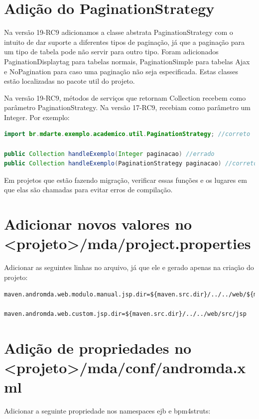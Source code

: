 \section{Adição do PaginationStrategy}
Na versão 19-RC9 adicionamos a classe abstrata PaginationStrategy com o intuito
de dar suporte a diferentes tipos de paginação, já que a paginação para um tipo de tabela pode não servir para outro tipo. Foram adicionados PaginationDisplaytag para tabelas normais, PaginationSimple para tabelas Ajax e NoPagination para caso uma paginação não seja especificada. Estas classes estão localizadas no pacote util do projeto.

Na versão 19-RC9, métodos de serviços que retornam Collection recebem como
parâmetro PaginationStrategy. Na versão 17-RC9,  recebiam como parâmetro um Integer. Por exemplo:

\begin{framed}
\begin{lstlisting}[language=java]
import br.mdarte.exemplo.academico.util.PaginationStrategy; //correto

public Collection handleExemplo(Integer paginacao) //errado
public Collection handleExemplo(PaginationStrategy paginacao) //correto
\end{lstlisting}
\end{framed}

Em projetos que estão fazendo migração, verificar essas funções e os lugares em
que elas são chamadas para evitar erros de compilação.

\section{Adicionar novos valores no <projeto>/mda/project.properties}
Adicionar as seguintes linhas no arquivo, já que ele e gerado apenas na criação
do projeto:

\begin{framed}
\begin{lstlisting}[language=xml]
maven.andromda.web.modulo.manual.jsp.dir=${maven.src.dir}/../../web/${maven.andromda.module.name.outlet.replace}/src/jsp

maven.andromda.web.custom.jsp.dir=${maven.src.dir}/../../web/src/jsp
\end{lstlisting}
\end{framed}

\section{Adição de propriedades no <projeto>/mda/conf/andromda.xml}
Adicionar a seguinte propriedade nos namespaces ejb e bpm4struts:

